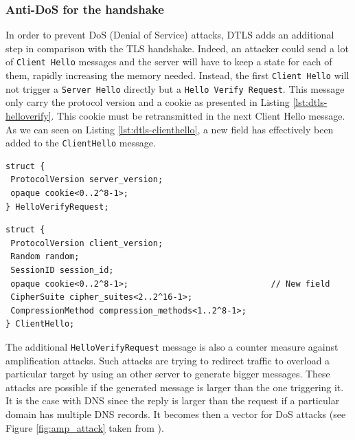 \subsubsection{Anti-DoS for the handshake}

In order to prevent DoS (Denial of Service) attacks, DTLS adds an additional step in comparison with the TLS handshake. Indeed, an attacker could send a lot of \texttt{Client Hello} messages and the server will have to keep a state for each of them, rapidly increasing the memory needed. Instead, the first \texttt{Client Hello} will not trigger a \texttt{Server Hello} directly but a \texttt{Hello Verify Request}. This message only carry the protocol version and a cookie as presented in Listing \ref{lst:dtls-helloverify}. This cookie must be retransmitted in the next Client Hello message. As we can seen on Listing \ref{lst:dtls-clienthello}, a new field has effectively been added to the \texttt{ClientHello} message.

\begin{lstlisting}[caption=DTLS HelloVerifyRequest message, label=lst:dtls-helloverify]
struct {
 ProtocolVersion server_version;
 opaque cookie<0..2^8-1>;
} HelloVerifyRequest;
\end{lstlisting}


\begin{lstlisting}[caption=DTLS ClientHello adapted message, label=lst:dtls-clienthello]
struct {
 ProtocolVersion client_version;
 Random random;
 SessionID session_id;
 opaque cookie<0..2^8-1>;                             // New field
 CipherSuite cipher_suites<2..2^16-1>;
 CompressionMethod compression_methods<1..2^8-1>;
} ClientHello;
\end{lstlisting}

The additional \texttt{HelloVerifyRequest} message is also a counter measure against amplification attacks. Such attacks are trying to redirect traffic to overload a particular target by using an other server to generate bigger messages. These attacks are possible if the generated message is larger than the one triggering it. It is the case with DNS since the reply is larger than the request if a particular domain has multiple DNS records. It becomes then a vector for DoS attacks (see Figure \ref{fig:amp_attack} taken from \cite{dns-amp}).


